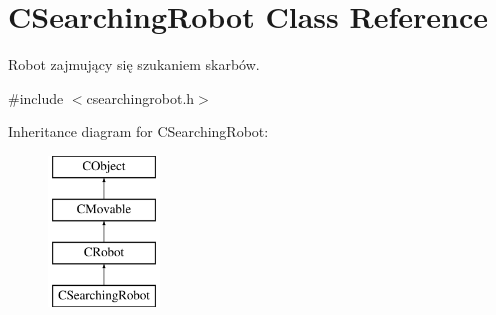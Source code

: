 \hypertarget{class_c_searching_robot}{}\section{C\+Searching\+Robot Class Reference}
\label{class_c_searching_robot}


Robot zajmujący się szukaniem skarbów.  




{\ttfamily \#include $<$csearchingrobot.\+h$>$}

Inheritance diagram for C\+Searching\+Robot\+:\begin{figure}[H]
\begin{center}
\leavevmode
\includegraphics[height=4.000000cm]{class_c_searching_robot}
\end{center}
\end{figure}
